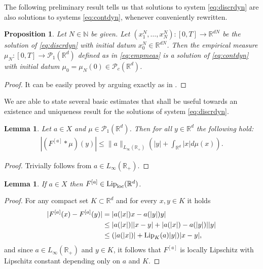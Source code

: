 \documentclass[A4paper,11pt]{article}
\newtheorem{lemma}[theorem]{Lemma}
\newtheorem{proposition}[theorem]{Proposition}
\theoremstyle{definition}
\newcommand{\Lip}{\textup{Lip}}
\newcommand{\loc}{\textup{loc}}
\newcommand{\N}{\mathbb{N}}
\newcommand{\R}{\mathbb{R}}
\newcommand{\PP}{\mathcal{P}_1}
\newcommand{\PC}{\mathcal{P}_c}
\newcommand{\Fun}[1]{F^{[#1]}}
\begin{document}
The following preliminary result tells us that solutions to system \eqref{eq:discrdyn} are also solutions to systems \eqref{eq:contdyn}, whenever conveniently rewritten.

\begin{proposition}\label{p-rewritten}
Let $N \in \N$ be given. Let $(x^N_1, \ldots, x^N_N):[0,T] \rightarrow \R^{dN}$ be the solution of \eqref{eq:discrdyn} with initial datum $x^{N}_0 \in \R^{dN}$. Then the empirical measure $\mu_N:[0,T] \rightarrow \PP(\R^d)$ defined as in \eqref{eq:empmeas} is a solution of \eqref{eq:contdyn} with initial datum $\mu_{0}= \mu_N(0) \in \PC(\R^d)$.
\end{proposition}
\begin{proof}
It can be easily proved by arguing exactly as in \cite[Lemma 4.3]{MFOC}.
\end{proof}

 We are able to state several basic estimates that shall be useful towards an existence and uniqueness result for the solutions of system \eqref{eq:discrdyn}.

\begin{lemma}\label{p-estkernel}
Let $a\in X$ and $\mu \in \PP(\R^d)$. Then for all $y \in \R^d$ the following hold:
\begin{align*}
|(\Fun{a} * \mu)(y)| \leq \|a\|_{L_{\infty}(\R_+)}\left( | y | + \int_{\R^d} | x | d\mu(x) \right).
\end{align*}
\end{lemma}
\begin{proof}
Trivially follows from $a \in L_{\infty}(\R_+)$.
\end{proof}

\begin{lemma}\label{p-Floclip}
If $a\in X$ then $\Fun{a} \in \Lip_\loc(\R^d)$.
\end{lemma}
\begin{proof}
For any compact set $K \subset \R^d$ and for every $x,y \in K$ it holds
\begin{align*}
|\Fun{a}(x) - \Fun{a}(y)| &= |a(|x|)x - a(|y|)y| \\
&\leq |a(|x|)| |x-y| + |a(|x|) - a(|y|)| |y| \\
&\leq (|a(|x|)| + \Lip_K(a) |y|) |x-y|,
\end{align*}
and since $a \in L_{\infty}(\R_+)$ and $y \in K$, it follows that $\Fun{a}$ is locally Lipschitz with Lipschitz constant depending only on $a$ and $K$.
\end{proof}
\end{document}
